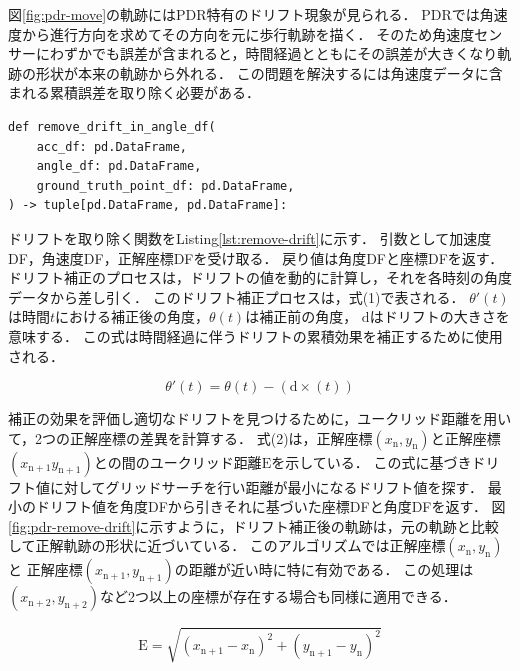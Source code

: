 


図\ref{fig:pdr-move}の軌跡にはPDR特有のドリフト現象が見られる．
PDRでは角速度から進行方向を求めてその方向を元に歩行軌跡を描く．
そのため角速度センサーにわずかでも誤差が含まれると，時間経過とともにその誤差が大きくなり軌跡の形状が本来の軌跡から外れる．
この問題を解決するには角速度データに含まれる累積誤差を取り除く必要がある．


\begin{lstlisting}[caption={ドリフト除去}, label=lst:remove-drift,float =h]
def remove_drift_in_angle_df(
    acc_df: pd.DataFrame,
    angle_df: pd.DataFrame,
    ground_truth_point_df: pd.DataFrame,
) -> tuple[pd.DataFrame, pd.DataFrame]:
\end{lstlisting}

ドリフトを取り除く関数をListing\ref{lst:remove-drift}に示す．
引数として加速度DF，角速度DF，正解座標DFを受け取る．
戻り値は角度DFと座標DFを返す．
ドリフト補正のプロセスは，ドリフトの値を動的に計算し，それを各時刻の角度データから差し引く．
このドリフト補正プロセスは，式(1)で表される．
$\theta'(t)$は時間$t$における補正後の角度，$\theta(t)$は補正前の角度，
$\mathrm{d}$はドリフトの大きさを意味する．
この式は時間経過に伴うドリフトの累積効果を補正するために使用される．


\vspace{5mm} %
\begin{equation}
	\theta'(t) = \theta(t) - (\mathrm{d} \times (t))
\end{equation}

\vspace{5mm} %

補正の効果を評価し適切なドリフトを見つけるために，ユークリッド距離を用いて，2つの正解座標の差異を計算する．
式(2)は，正解座標$(x_{\mathrm{n}}, y_{\mathrm{n}})$と正解座標$(x_{\mathrm{n+1}}
	y_{\mathrm{n+1}})$との間のユークリッド距離$\mathrm{E}$を示している．
この式に基づきドリフト値に対してグリッドサーチを行い距離が最小になるドリフト値を探す．
最小のドリフト値を角度DFから引きそれに基づいた座標DFと角度DFを返す．
図\ref{fig:pdr-remove-drift}に示すように，ドリフト補正後の軌跡は，元の軌跡と比較して正解軌跡の形状に近づいている．
このアルゴリズムでは正解座標$(x_{\mathrm{n}}, y_{\mathrm{n}})$と
正解座標$(x_{\mathrm{n+1}}, y_{\mathrm{n+1}})$の距離が近い時に特に有効である．
この処理は$(x_{\mathrm{n+2}}, y_{\mathrm{n+2}})$など2つ以上の座標が存在する場合も同様に適用できる．

\vspace{5mm} %
\begin{equation}
	\mathrm{E} = \sqrt{(x_{\mathrm{n+1}} - x_{\mathrm{n}})^2 + (y_{\mathrm{n+1}} - y_{\mathrm{n}})^2}
\end{equation}
\vspace{5mm} %

